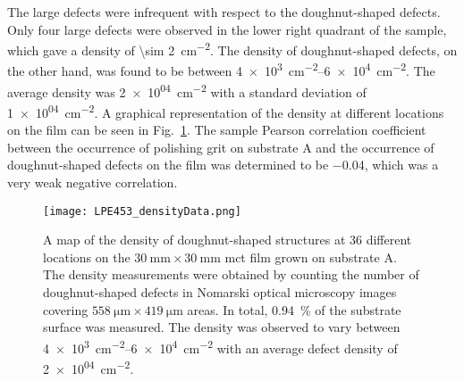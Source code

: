 The large defects were infrequent with respect to the doughnut-shaped defects. Only four large defects were observed in the lower right quadrant of the sample, which gave a density of \SI{\sim 2}{\centi\metre^{-2}}. The density of doughnut-shaped defects, on the other hand, was found to be between \SIrange{4e+3}{6e+4}{\centi\metre^{-2}}. The average density was \SI{2e+04}{\centi\metre^{-2}} with a standard deviation of \SI{1e+04}{\centi\metre^{-2}}. A graphical representation of the density at different locations on the film can be seen in Fig.~\ref{fig:LPE453_densityData}. The sample Pearson correlation coefficient between the occurrence of polishing grit on substrate A and the occurrence of doughnut-shaped defects on the film was determined to be \SI{-0.04}{}, which was a very weak negative correlation.


\begin{figure}[htbp]
    \centering
    \texttt{[image: LPE453\_densityData.png]}
    \caption[Map of the density of doughnut-shaped structures on the \ac{mct} film grown on substrate A.]{A map of the density of doughnut-shaped structures at 36 different locations on the $\SI{30}{\milli\metre}\times\SI{30}{\milli\metre}$ \ac{mct} film grown on substrate A. The density measurements were obtained by counting the number of doughnut-shaped defects in Nomarski optical microscopy images covering $\SI{558}{\micro\metre}\times\SI{419}{\micro\metre}$ areas. In total, \SI{0.94}{\percent} of the substrate surface was measured. The density was observed to vary between \SIrange{4e+3}{6e+4}{\centi\metre^{-2}} with an average defect density of \SI{2e+04}{\centi\metre^{-2}}.}
    \label{fig:LPE453_densityData}
\end{figure}





